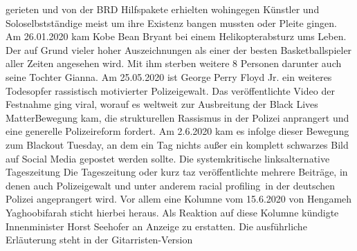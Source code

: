 \documentclass[../Liederbuch/LiederbuchGitarristen.tex]{subfiles}
\begin{document}
{{gerieten und von der BRD Hilfspakete erhielten wohingegen Künstler und Soloselbstständige meist um ihre Existenz bangen mussten oder Pleite gingen. Am 26.01.2020 kam Kobe Bean Bryant bei einem Helikopterabsturz ums Leben. Der auf Grund vieler hoher Auszeichnungen als einer der besten Basketballspieler aller Zeiten angesehen wird. Mit ihm sterben weitere 8 Personen darunter auch seine Tochter Gianna. Am 25.05.2020 ist George Perry Floyd Jr. ein weiteres Todesopfer rassistisch motivierter Polizeigewalt. Das veröffentlichte Video der Festnahme ging viral, worauf es weltweit zur Ausbreitung der \dq Black Lives Matter\dq\-Bewegung kam, die strukturellen Rassismus in der Polizei anprangert und eine generelle Polizeireform fordert. Am 2.6.2020 kam es infolge dieser Bewegung zum Blackout Tuesday, an dem ein Tag nichts außer ein komplett schwarzes Bild auf Social Media gepostet werden sollte. Die systemkritische linksalternative Tageszeitung Die Tageszeitung oder kurz taz veröffentlichte mehrere Beiträge, in denen auch Polizeigewalt und unter anderem \dq racial profiling\dq\ in der deutschen Polizei angeprangert wird. Vor allem eine Kolumne vom 15.6.2020 von Hengameh Yaghoobifarah sticht hierbei heraus. Als Reaktion auf diese Kolumne kündigte Innenminister Horst Seehofer an Anzeige zu erstatten.
\else
Die ausführliche Erläuterung steht in der Gitarristen-Version
\fi
}
}
\end{document}
